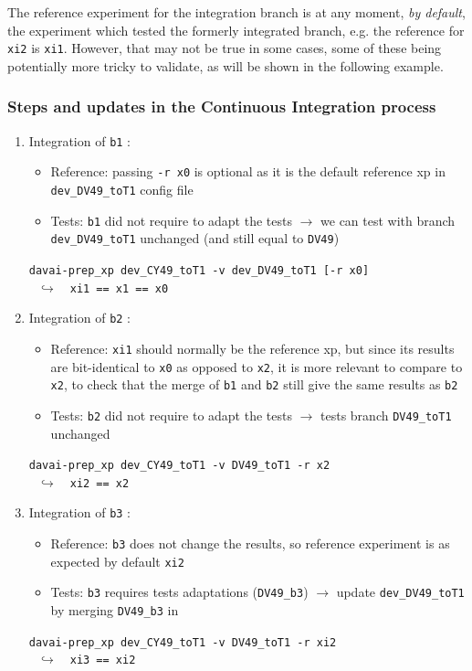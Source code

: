 \documentclass[a4paper,10pt,twoside]{article}
\begin{document}
\begin{appendix}
The reference experiment for the integration branch is at any moment, \textit{by default}, the experiment which tested the formerly integrated branch, e.g. the reference for \texttt{xi2} is \texttt{xi1}. However, that may not be true in some cases, some of these being potentially more tricky to validate, as will be shown in the following example.

\subsubsection{Steps and updates in the Continuous Integration process}
\begin{enumerate}[label=(\arabic*)]
 \item Integration of \texttt{b1} :
 \begin{itemize}
  \item Reference: passing \texttt{-r x0} is optional as it is the default reference xp in \texttt{dev\_DV49\_toT1} config file
  \item Tests: \texttt{b1} did not require to adapt the tests $\rightarrow$ we can test with branch \texttt{dev\_DV49\_toT1} unchanged (and still equal to \texttt{DV49})
 \end{itemize}
 \texttt{davai-prep\_xp dev\_CY49\_toT1 -v dev\_DV49\_toT1 [-r x0]}\\
 $~~~\hookrightarrow~~~$ \texttt{xi1 == x1 == x0}

 \item Integration of \texttt{b2} :
 \begin{itemize}
  \item Reference: \texttt{xi1} should normally be the reference xp, but since its results are bit-identical to \texttt{x0} as opposed to \texttt{x2}, it is more relevant to compare to \texttt{x2}, to check that the merge of \texttt{b1} and \texttt{b2} still give the same results as \texttt{b2}
  \item Tests: \texttt{b2} did not require to adapt the tests $\rightarrow$ tests branch \texttt{DV49\_toT1} unchanged
 \end{itemize}
 \texttt{davai-prep\_xp dev\_CY49\_toT1 -v DV49\_toT1 -r \texttt{x2}}\\
 $~~~\hookrightarrow~~~$ \texttt{xi2 == x2}

 \item Integration of \texttt{b3} :
 \begin{itemize}
  \item Reference: \texttt{b3} does not change the results, so reference experiment is as expected by default \texttt{xi2}
  \item Tests: \texttt{b3} requires tests adaptations (\texttt{DV49\_b3}) $\rightarrow$ update \texttt{dev\_DV49\_toT1} by merging \texttt{DV49\_b3} in
 \end{itemize}
 \texttt{davai-prep\_xp dev\_CY49\_toT1 -v DV49\_toT1 -r xi2}\\
 $~~~\hookrightarrow~~~$ \texttt{xi3 == xi2}
 

\end{enumerate}
\end{appendix}
\end{document}
